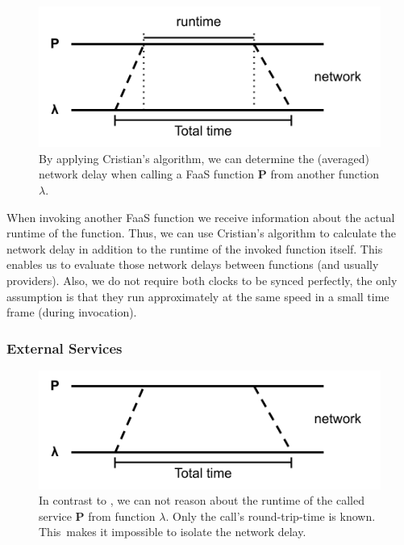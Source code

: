 \documentclass[../main.tex]{subfiles}
\begin{document}
\begin{figure}
\begin{center}
  \includegraphics[]{./cristian.png}
\end{center}
\caption[Function Call Time Measurement]{%
  By applying Cristian's algorithm, we can determine the (averaged) network delay when calling 
  a FaaS function \textbf{P} from another function $\lambda$.
}
\label{fig:cristiansTimeMeasurement}
\end{figure}

When invoking another FaaS function we receive information about the actual runtime of the function.
Thus, we can use Cristian's algorithm \cite{cristian_probabilistic_1989} to calculate the network delay 
in addition to the runtime of the invoked function itself. 
This enables us to evaluate those network delays between functions (and usually providers). 
Also, we do not require both clocks to be synced perfectly, 
the only assumption is that they run approximately at the same speed in a small time frame (during invocation).

\subsubsection{External Services}%
\label{ssub:callingTimeProbeService}

\begin{figure}
\begin{center}
  \includegraphics[]{./round-trip-time.png}
\end{center}
\caption[External Service Time Measurement]{%
  In contrast to , we can not reason about the runtime of the called service \textbf{P} 
  from function $\lambda.$ Only the call's round-trip-time is known. 
  This~makes it impossible to isolate the network delay.
}
\label{fig:externalServiceTimeMeasurement}
\end{figure}
\end{document}
